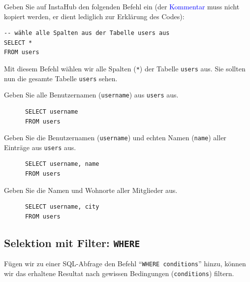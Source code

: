 \begin{myexample}
Geben Sie auf InstaHub den folgenden Befehl ein (der \textcolor{blue}{Kommentar} muss nicht kopiert werden, er dient lediglich zur Erklärung des Codes):

\begin{lstlisting}
-- wähle alle Spalten aus der Tabelle users aus
SELECT *
FROM users
\end{lstlisting}

Mit diesem Befehl wählen wir alle Spalten (\lstinline|*|) der Tabelle \lstinline|users| aus.
Sie sollten nun die gesamte Tabelle \texttt{users} sehen.
\end{myexample}

\begin{myexercise}
  Geben Sie alle Benutzernamen (\texttt{username}) aus \texttt{users} aus.
  \begin{myanswer}
    \begin{lstlisting}
      SELECT username
      FROM users
      \end{lstlisting}
  \end{myanswer}
\end{myexercise}

\begin{myexercise}
  Geben Sie die Benutzernamen (\texttt{username}) und echten Namen (\texttt{name}) aller Einträge aus \texttt{users} aus.
  \begin{myanswer}
    \begin{lstlisting}
      SELECT username, name
      FROM users
    \end{lstlisting}
  \end{myanswer}
\end{myexercise}

\begin{myexercise}
  Geben Sie die Namen und Wohnorte aller Mitglieder aus.
  \begin{myanswer}
    \begin{lstlisting}
      SELECT username, city
      FROM users
    \end{lstlisting}
  \end{myanswer}
\end{myexercise}

\subsection{Selektion mit Filter: \texorpdfstring{\lstinline|WHERE|}{WHERE}}
Fügen wir zu einer \gls{SQL}-Abfrage den Befehl ``\lstinline|WHERE conditions|'' hinzu, können wir das erhaltene Resultat nach gewissen Bedingungen (\texttt{conditions}) filtern.

